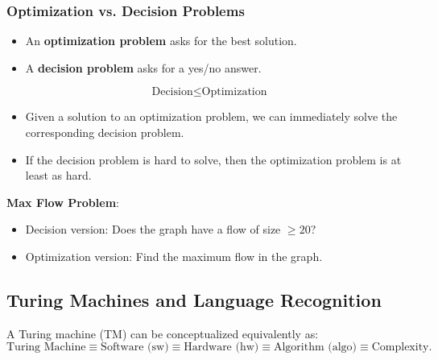 \subsubsection{Optimization vs. Decision Problems}
\begin{definition}
    \begin{itemize}
        \item An \textbf{optimization problem} asks for the best solution.
        \item A \textbf{decision problem} asks for a yes/no answer.
    \end{itemize}
    \vspace{1em}
    \[
    \text{Decision} \leq \text{Optimization}
    \]
    \begin{itemize}
        \item Given a solution to an optimization problem, we can immediately solve the corresponding decision problem.
        \item If the decision problem is hard to solve, then the optimization problem is at least as hard.
    \end{itemize}
\end{definition}

\begin{example} \textbf{Max Flow Problem}:
    \begin{itemize}
        \item Decision version: Does the graph have a flow of size $\geq 20$?
        \item Optimization version: Find the maximum flow in the graph.
    \end{itemize}
\end{example}

\subsection{Turing Machines and Language Recognition}
\begin{definition}
    A Turing machine (TM) can be conceptualized equivalently as:
    \[
    \text{Turing Machine} \equiv \text{Software (sw)} \equiv \text{Hardware (hw)} \equiv \text{Algorithm (algo)} \equiv \text{Complexity}.
    \]
\end{definition}

